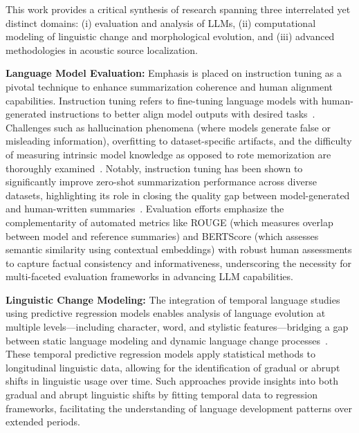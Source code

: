 \documentclass[sigconf]{acmart}
\begin{document}
This work provides a critical synthesis of research spanning three interrelated yet distinct domains: (i) evaluation and analysis of LLMs, (ii) computational modeling of linguistic change and morphological evolution, and (iii) advanced methodologies in acoustic source localization.

\textbf{Language Model Evaluation:} Emphasis is placed on instruction tuning as a pivotal technique to enhance summarization coherence and human alignment capabilities. Instruction tuning refers to fine-tuning language models with human-generated instructions to better align model outputs with desired tasks~\cite{ref10,ref1}. Challenges such as hallucination phenomena (where models generate false or misleading information), overfitting to dataset-specific artifacts, and the difficulty of measuring intrinsic model knowledge as opposed to rote memorization are thoroughly examined~\cite{ref10,ref51,ref52}. Notably, instruction tuning has been shown to significantly improve zero-shot summarization performance across diverse datasets, highlighting its role in closing the quality gap between model-generated and human-written summaries~\cite{ref1}. Evaluation efforts emphasize the complementarity of automated metrics like ROUGE (which measures overlap between model and reference summaries) and BERTScore (which assesses semantic similarity using contextual embeddings) with robust human assessments to capture factual consistency and informativeness, underscoring the necessity for multi-faceted evaluation frameworks in advancing LLM capabilities.

\textbf{Linguistic Change Modeling:} The integration of temporal language studies using predictive regression models enables analysis of language evolution at multiple levels—including character, word, and stylistic features—bridging a gap between static language modeling and dynamic language change processes~\cite{ref41}. These temporal predictive regression models apply statistical methods to longitudinal linguistic data, allowing for the identification of gradual or abrupt shifts in linguistic usage over time. Such approaches provide insights into both gradual and abrupt linguistic shifts by fitting temporal data to regression frameworks, facilitating the understanding of language development patterns over extended periods.
\end{document}
